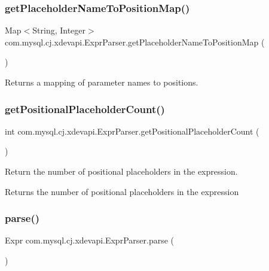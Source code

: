 \subsubsection{\texorpdfstring{get\+Placeholder\+Name\+To\+Position\+Map()}{getPlaceholderNameToPositionMap()}}
{\footnotesize\ttfamily Map$<$String, Integer$>$ com.\+mysql.\+cj.\+xdevapi.\+Expr\+Parser.\+get\+Placeholder\+Name\+To\+Position\+Map (\begin{DoxyParamCaption}{ }\end{DoxyParamCaption})}

\begin{DoxyReturn}{Returns}
a mapping of parameter names to positions. 
\end{DoxyReturn}
\mbox{\label{classcom_1_1mysql_1_1cj_1_1xdevapi_1_1_expr_parser_a1966233da75608f47433e709b6493adf}} 
\subsubsection{\texorpdfstring{get\+Positional\+Placeholder\+Count()}{getPositionalPlaceholderCount()}}
{\footnotesize\ttfamily int com.\+mysql.\+cj.\+xdevapi.\+Expr\+Parser.\+get\+Positional\+Placeholder\+Count (\begin{DoxyParamCaption}{ }\end{DoxyParamCaption})}

Return the number of positional placeholders in the expression.

\begin{DoxyReturn}{Returns}
the number of positional placeholders in the expression 
\end{DoxyReturn}
\mbox{\label{classcom_1_1mysql_1_1cj_1_1xdevapi_1_1_expr_parser_a4b585b964454cc26c544d824d33b3498}} 
\subsubsection{\texorpdfstring{parse()}{parse()}}
{\footnotesize\ttfamily Expr com.\+mysql.\+cj.\+xdevapi.\+Expr\+Parser.\+parse (\begin{DoxyParamCaption}{ }\end{DoxyParamCaption})}

